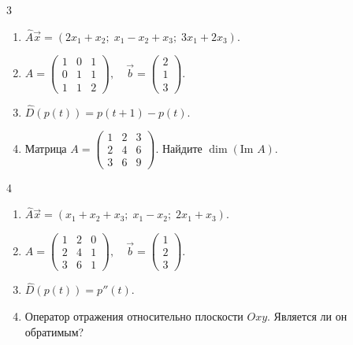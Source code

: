 \documentclass[12pt,a4paper]{article}
\theoremstyle{plain}
\theoremstyle{definition}
\begin{document}
\begin{taskbox}{3}
    \begin{enumerate}
        \item $\hat{A}\vec{x} = (2x_1 + x_2; \; x_1 - x_2 + x_3; \; 3x_1 + 2x_3)$.
        \item $A = \begin{pmatrix} 1 & 0 & 1 \\ 0 & 1 & 1 \\ 1 & 1 & 2 \end{pmatrix}, \quad \vec{b} = \begin{pmatrix} 2 \\ 1 \\ 3 \end{pmatrix}$.
        \item $\hat{D}(p(t)) = p(t+1) - p(t)$.
        \item Матрица $A = \begin{pmatrix} 1 & 2 & 3 \\ 2 & 4 & 6 \\ 3 & 6 & 9 \end{pmatrix}$. Найдите $\dim(\text{Im } A)$.
    \end{enumerate}
\end{taskbox}

\begin{taskbox}{4}
    \begin{enumerate}
        \item $\hat{A}\vec{x} = (x_1 + x_2 + x_3; \; x_1 - x_2; \; 2x_1 + x_3)$.
        \item $A = \begin{pmatrix} 1 & 2 & 0 \\ 2 & 4 & 1 \\ 3 & 6 & 1 \end{pmatrix}, \quad \vec{b} = \begin{pmatrix} 1 \\ 2 \\ 3 \end{pmatrix}$.
        \item $\hat{D}(p(t)) = p''(t)$.
        \item Оператор отражения относительно плоскости $Oxy$. Является ли он обратимым?
    \end{enumerate}
\end{taskbox}
\end{document}
